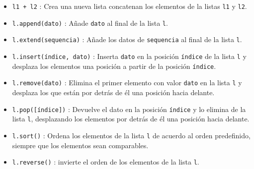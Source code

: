 \documentclass[
  spanish,
  a4paper,
]{scrreport}
\providecommand{\tightlist}{%
  \setlength{\itemsep}{0pt}\setlength{\parskip}{0pt}}
\begin{document}
\begin{itemize}
\tightlist
\item
  \texttt{l1\ +\ l2} : Crea una nueva lista concatenan los elementos de
  la listas \texttt{l1} y \texttt{l2}.
\item
  \texttt{l.append(dato)} : Añade \texttt{dato} al final de la lista
  \texttt{l}.
\item
  \texttt{l.extend(sequencia)} : Añade los datos de \texttt{sequencia}
  al final de la lista \texttt{l}.
\item
  \texttt{l.insert(índice,\ dato)} : Inserta \texttt{dato} en la
  posición \texttt{índice} de la lista \texttt{l} y desplaza los
  elementos una posición a partir de la posición \texttt{índice}.
\item
  \texttt{l.remove(dato)} : Elimina el primer elemento con valor
  \texttt{dato} en la lista \texttt{l} y desplaza los que están por
  detrás de él una posición hacia delante.
\item
  \texttt{l.pop({[}índice{]})} : Devuelve el dato en la posición
  \texttt{índice} y lo elimina de la lista \texttt{l}, desplazando los
  elementos por detrás de él una posición hacia delante.
\item
  \texttt{l.sort()} : Ordena los elementos de la lista \texttt{l} de
  acuerdo al orden predefinido, siempre que los elementos sean
  comparables.
\item
  \texttt{l.reverse()} : invierte el orden de los elementos de la lista
  \texttt{l}.
\end{itemize}
\end{document}
